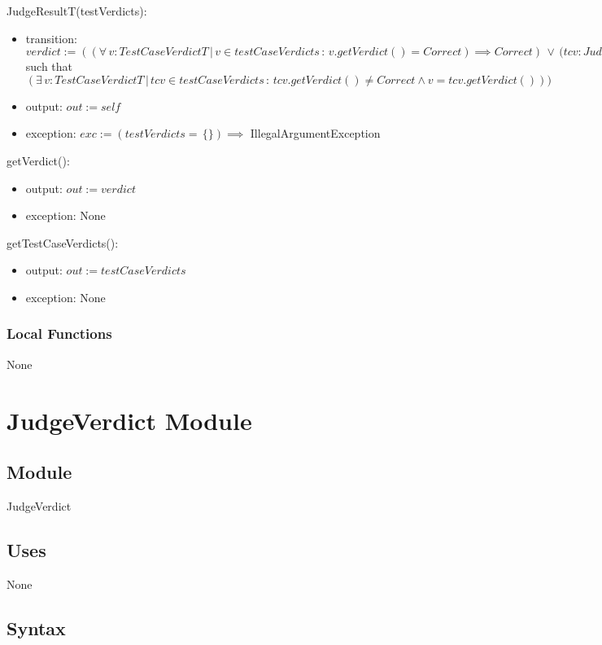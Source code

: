 \documentclass[12pt, titlepage]{article}
\begin{document}
\noindent JudgeResultT(testVerdicts):
\begin{itemize}
\item transition: $verdict := ((\forall\, v: TestCaseVerdictT \,|\, v \in testCaseVerdicts \,:\, v.getVerdict() = Correct) \implies Correct) \, \lor \, (tcv: JudgeVerdict$ such that $(\exists\, v: TestCaseVerdictT \,|\, tcv \in testCaseVerdicts \,:\, tcv.getVerdict() \neq Correct \land v = tcv.getVerdict()))$ 
\item output: $out := self$
\item exception: $exc := (testVerdicts = \, \{\}) \implies$ IllegalArgumentException 
\end{itemize}

\noindent getVerdict():
\begin{itemize}
\item output: $out := verdict$
\item exception: None
\end{itemize}

\noindent getTestCaseVerdicts():
\begin{itemize}
\item output: $out := testCaseVerdicts$
\item exception: None
\end{itemize}

\subsubsection{Local Functions}

None

\newpage

\section{JudgeVerdict Module} \label{JudgeVerdict} 

\subsection{Module}

JudgeVerdict

\subsection{Uses}

None

\subsection{Syntax}
\end{document}
